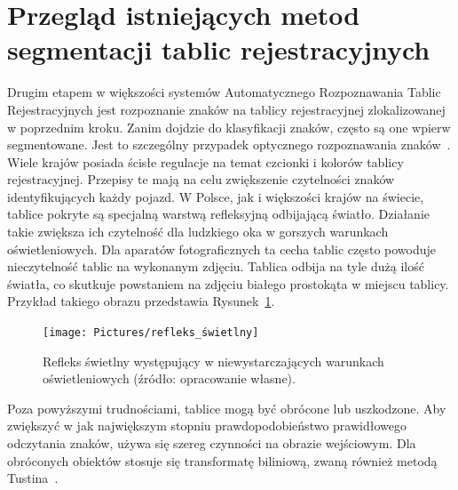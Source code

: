 \section{Przegląd istniejących metod segmentacji tablic rejestracyjnych}

Drugim etapem w większości systemów Automatycznego Rozpoznawania Tablic Rejestracyjnych jest rozpoznanie znaków na tablicy rejestracyjnej zlokalizowanej w poprzednim kroku.
Zanim dojdzie do klasyfikacji znaków, często są one wpierw segmentowane.
Jest to szczególny przypadek optycznego rozpoznawania znaków~\cite{9310202}.
Wiele krajów posiada ścisłe regulacje na temat czcionki i kolorów tablicy rejestracyjnej.
Przepisy te mają na celu zwiększenie czytelności znaków identyfikujących każdy pojazd.
W Polsce, jak i większości krajów na świecie, tablice pokryte są specjalną warstwą refleksyjną odbijającą światło.
Działanie takie zwiększa ich czytelność dla ludzkiego oka w gorszych warunkach oświetleniowych.
Dla aparatów fotograficznych ta cecha tablic często powoduje nieczytelność tablic na wykonanym zdjęciu.
Tablica odbija na tyle dużą ilość światła, co skutkuje powstaniem na zdjęciu białego prostokąta w miejscu tablicy.
Przykład takiego obrazu przedstawia Rysunek~\ref{fig:refleks_swietlny}.
\begin{figure}[!ht]
    \centering
    \texttt{[image: Pictures/refleks\_świetlny]}
    \caption{Refleks świetlny występujący w niewystarczających warunkach oświetleniowych (źródło: opracowanie własne).}
    \label{fig:refleks_swietlny}
\end{figure}
\FloatBarrier
Poza powyższymi trudnościami, tablice mogą być obrócone lub uszkodzone.
Aby zwiększyć w jak największym stopniu prawdopodobieństwo prawidłowego odczytania znaków, używa się szereg czynności na obrazie wejściowym.
Dla obróconych obiektów stosuje się transformatę biliniową, zwaną również metodą Tustina~\cite{Xu2006AMO}.

